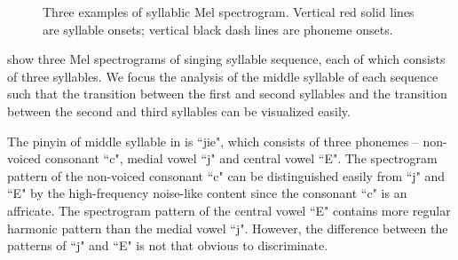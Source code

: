 \begin{figure}[ht!]
    \centering
    \hfill
    \hfill

  
    \caption[]{Three examples of syllablic Mel spectrogram. Vertical red solid lines are syllable onsets; vertical black dash lines are phoneme onsets.}
    \label{fig:ch4:task1_visualization}
\end{figure}

 show three Mel spectrograms of singing syllable sequence, each of which consists of three syllables. We focus the analysis of the middle syllable of each sequence such that the transition between the first and second syllables and the transition between the second and third syllables can be visualized easily. 

The pinyin of middle syllable in  is ``jie", which consists of three phonemes -- non-voiced consonant ``c", medial vowel ``j" and central vowel ``E". The spectrogram pattern of the non-voiced consonant ``c" can be distinguished easily from ``j" and ``E" by the high-frequency noise-like content since the consonant ``c" is an affricate. The spectrogram pattern of the central vowel ``E" contains more regular harmonic pattern than the medial vowel ``j". However, the difference between the patterns of ``j" and ``E" is not that obvious to discriminate.
 

